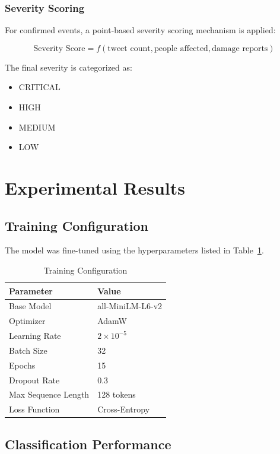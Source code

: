 \documentclass[pdflatex,sn-mathphys-num]{sn-jnl}%
\theoremstyle{thmstyleone}%
\theoremstyle{thmstyletwo}%
\theoremstyle{thmstylethree}%
\begin{document}
\subsubsection{Severity Scoring}

For confirmed events, a point-based severity scoring mechanism is applied:

\begin{equation}
\text{Severity Score} = f(\text{tweet count}, \text{people affected}, \text{damage reports})
\end{equation}

The final severity is categorized as:
\begin{itemize}
    \item CRITICAL
    \item HIGH
    \item MEDIUM
    \item LOW
\end{itemize}

\section{Experimental Results}

\subsection{Training Configuration}

The model was fine-tuned using the hyperparameters listed in Table~\ref{tab:train_config}.

\begin{table}[h]
\centering
\caption{Training Configuration}
\label{tab:train_config}
\begin{tabular}{|l|l|}
\hline
\textbf{Parameter} & \textbf{Value} \\
\hline
Base Model & all-MiniLM-L6-v2 \\
Optimizer & AdamW \\
Learning Rate & $2 \times 10^{-5}$ \\
Batch Size & 32 \\
Epochs & 15 \\
Dropout Rate & 0.3 \\
Max Sequence Length & 128 tokens \\
Loss Function & Cross-Entropy \\
\hline
\end{tabular}
\end{table}

\subsection{Classification Performance}
\end{document}
